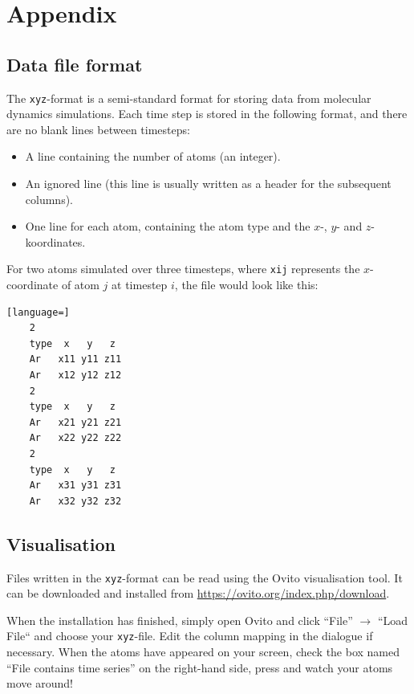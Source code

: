 \documentclass[11pt,british,a4paper]{report}
\renewcommand{\thesubsection}{\arabic{section}\alph{subsection})}
\begin{document}
\appendix
\section*{Appendix}
\setcounter{subsection}{0}
\renewcommand{\thesubsection}{\Alph{subsection}}



\subsection{Data file format}\label{app:xyz}
The \texttt{xyz}-format is a semi-standard format for storing data from molecular dynamics simulations. Each time step is stored in the following format, and there are no blank lines between timesteps:
\begin{itemize}
    \item A line containing the number of atoms (an integer).
    \item An ignored line (this line is usually written as a header for the subsequent columns).
    \item One line for each atom, containing the atom type and the \(x\)-, \(y\)- and \(z\)-koordinates.
\end{itemize}
For two atoms simulated over three timesteps, where \texttt{xij} represents the \(x\)-coordinate of atom \(j\) at timestep \(i\), the file would look like this:
\begin{lstlisting}[language=]
    2
    type  x   y   z
    Ar   x11 y11 z11
    Ar   x12 y12 z12
    2
    type  x   y   z
    Ar   x21 y21 z21
    Ar   x22 y22 z22
    2
    type  x   y   z
    Ar   x31 y31 z31
    Ar   x32 y32 z32
\end{lstlisting}


\tikzexternaldisable
\subsection{Visualisation}\label{app:ovito}
Files written in the \texttt{xyz}-format can be read using the Ovito visualisation tool. It can be downloaded and installed from \url{https://ovito.org/index.php/download}.

When the installation has finished, simply open Ovito and click ``File'' \(\to\) ``Load File`` and choose your \texttt{xyz}-file. Edit the column mapping in the dialogue if necessary. When the atoms have appeared on your screen, check the box named ``File contains time series'' on the right-hand side, press  and watch your atoms move around!
\end{document}
